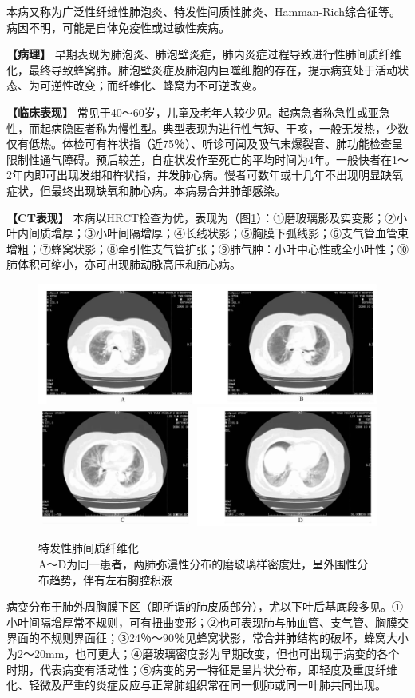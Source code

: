 本病又称为广泛性纤维性肺泡炎、特发性间质性肺炎、Hamman-Rich综合征等。病因不明，可能是自体免疫性或过敏性疾病。

\textbf{【病理】}
早期表现为肺泡炎、肺泡壁炎症，肺内炎症过程导致进行性肺间质纤维化，最终导致蜂窝肺。肺泡壁炎症及肺泡内巨噬细胞的存在，提示病变处于活动状态、为可逆性改变；而纤维化、蜂窝为不可逆改变。

\textbf{【临床表现】}
常见于40～60岁，儿童及老年人较少见。起病急者称急性或亚急性，而起病隐匿者称为慢性型。典型表现为进行性气短、干咳，一般无发热，少数仅有低热。体检可有杵状指（近75％）、听诊可闻及吸气末爆裂音、肺功能检查呈限制性通气障碍。预后较差，自症状发作至死亡的平均时间为4年。一般快者在1～2年内即可出现发绀和杵状指，并发肺心病。慢者可数年或十几年不出现明显缺氧症状，但最终出现缺氧和肺心病。本病易合并肺部感染。

\textbf{【CT表现】}
本病以HRCT检查为优，表现为（图\ref{fig9-41}）：①磨玻璃影及实变影；②小叶内间质增厚；③小叶间隔增厚；④长线状影；⑤胸膜下弧线影；⑥支气管血管束增粗；⑦蜂窝状影；⑧牵引性支气管扩张；⑨肺气肿：小叶中心性或全小叶性；⑩肺体积可缩小，亦可出现肺动脉高压和肺心病。



\begin{figure}[!htbp]
 \centering
 \includegraphics[width=.7\textwidth,height=\textheight,keepaspectratio]{./images/Image00236.jpg}
 \includegraphics[width=.7\textwidth,height=\textheight,keepaspectratio]{./images/Image00237.jpg}
 \captionsetup{justification=centering}
 \caption{特发性肺间质纤维化\\{\small A～D为同一患者，两肺弥漫性分布的磨玻璃样密度灶，呈外围性分布趋势，伴有左右胸腔积液}}
 \label{fig9-41}
  \end{figure} 

病变分布于肺外周胸膜下区（即所谓的肺皮质部分），尤以下叶后基底段多见。①小叶间隔增厚常不规则，可有扭曲变形；②也可表现肺与肺血管、支气管、胸膜交界面的不规则界面征；③24％～90％见蜂窝状影，常合并肺结构的破坏，蜂窝大小为2～20mm，也可更大；④磨玻璃密度影为早期改变，但也可出现于病变的各个时期，代表病变有活动性；⑤病变的另一特征是呈片状分布，即轻度及重度纤维化、轻微及严重的炎症反应与正常肺组织常在同一侧肺或同一叶肺共同出现。

